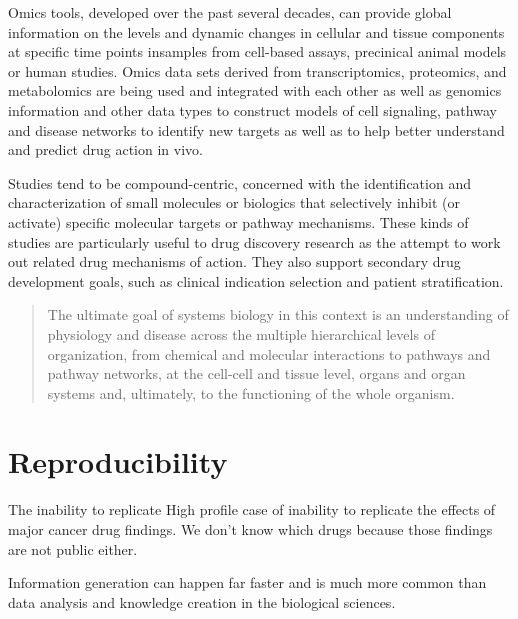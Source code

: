Omics tools, developed over the past several decades, can provide global information on the levels and dynamic changes in cellular and tissue components at specific time points insamples from cell-based assays, precinical animal models or human studies. Omics data sets derived from transcriptomics, proteomics, and metabolomics are being used and integrated with each other as well as genomics information and other data types to construct models of cell signaling, pathway and disease networks to identify new targets as well as to help better understand and predict drug action in vivo.

Studies tend to be compound-centric, concerned with the identification and characterization of small molecules or biologics that selectively inhibit (or activate) specific molecular targets or pathway mechanisms. These kinds of studies are particularly useful to drug discovery research as the attempt to work out related drug mechanisms of action. They also support secondary drug development goals, such as clinical indication selection and patient stratification. \cite{Berg2014}

\begin{quote}
The ultimate goal of systems biology in this context is an understanding of physiology and disease across the multiple hierarchical levels of organization, from chemical and molecular interactions to pathways and pathway networks, at the cell-cell and tissue level, organs and organ systems and, ultimately, to the functioning of the whole organism.
\end{quote}


\section{Reproducibility}

The inability to replicate
High profile case of inability to replicate the effects of major cancer drug findings. \cite{} We don't know which drugs because those findings are not public either.

Information generation can happen far faster and is much more common than data analysis and knowledge creation in the biological sciences.

